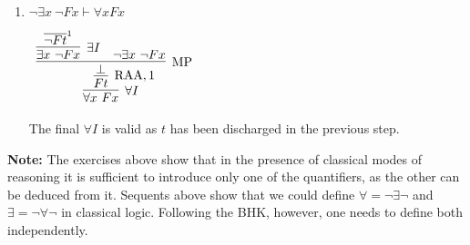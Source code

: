 \documentclass[11pt]{report}
\newcommand{\temp}[2]{{\overline{#2}}^{#1}}
\begin{document}
\begin{enumerate}
\begin{enumerate}
			\item $ \lnot \exists x \ \lnot Fx \vdash \forall x Fx$
			
			\begin{center}
				$\begin{array}{c}
					\infer[\forall I]{\forall x \ Fx}
						{\infer[\RAA,1]{Ft}
							{\infer[\MP]{\bot}
								{\infer[\exists I]{\exists x \ \lnot Fx}
									{\temp{1}{\lnot Ft}}
								&
								\lnot \exists x \ \lnot Fx}}}
				\end{array}$
			\end{center}

			The final $\forall I$ is valid as $t$ has been discharged in the previous step.

		\end{enumerate}
\end{enumerate}
	
\textbf{Note:} The exercises above show that in the presence of classical modes of reasoning it is sufficient to introduce only one of the quantifiers, as the other can be deduced from it. Sequents above show that we could define $\forall = \lnot \exists \lnot$ and $\exists = \lnot \forall \lnot$ in classical logic. Following the BHK, however, one needs to define both independently. 
\end{document}
